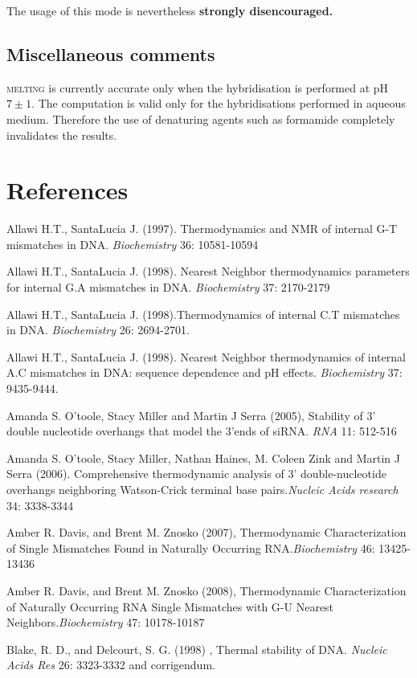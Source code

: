 \documentclass{article}
\begin{document}
  The usage of this mode is nevertheless  \textbf{strongly disencouraged.}   
   
\subsection{Miscellaneous comments }  
\textsc{melting} is currently accurate only when the hybridisation is performed
at pH $7\pm 1$.  The computation is valid only for the hybridisations performed
in aqueous medium. Therefore the use of denaturing agents such as formamide
completely invalidates the results.
   
\section{References }
Allawi H.T., SantaLucia J. (1997). Thermodynamics and NMR of internal G-T mismatches 
in DNA. \textit{Biochemistry}  36: 10581-10594   

Allawi H.T., SantaLucia J. (1998). Nearest Neighbor thermodynamics parameters 
for internal G.A mismatches in DNA. \textit{Biochemistry} 37: 2170-2179

Allawi H.T., SantaLucia J. (1998).Thermodynamics of internal C.T mismatches in DNA.
\textit{Biochemistry} 26: 2694-2701.

Allawi H.T., SantaLucia J. (1998). Nearest Neighbor thermodynamics of internal 
A.C mismatches in DNA: sequence dependence and pH effects.
\textit{Biochemistry} 37: 9435-9444.

Amanda S. O'toole, Stacy Miller and Martin J Serra (2005), Stability of 3' double 
nucleotide overhangs that model the 3'ends of siRNA. \textit{RNA} 11: 512-516

Amanda S. O'toole, Stacy Miller, Nathan Haines, M. Coleen Zink and Martin J Serra (2006). 
Comprehensive thermodynamic analysis of 3' double-nucleotide overhangs neighboring 
Watson-Crick terminal base pairs.\textit{Nucleic Acids research} 34: 3338-3344

Amber R. Davis, and Brent M. Znosko (2007), Thermodynamic Characterization of Single 
Mismatches Found in Naturally Occurring RNA.\textit{Biochemistry} 46: 13425-13436

Amber R. Davis, and Brent M. Znosko (2008), Thermodynamic Characterization of Naturally 
Occurring RNA Single Mismatches with G-U Nearest Neighbors.\textit{Biochemistry} 
47: 10178-10187

Blake, R. D., and Delcourt, S. G. (1998) , Thermal stability of DNA.
\textit{Nucleic Acids Res} 26: 3323-3332 and corrigendum.
\end{document}
